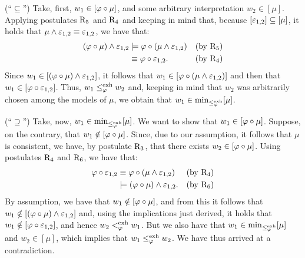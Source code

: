 \begin{prf*}{}{}
	(``$\subseteq$'') 
	Take, first, $w_1\in[\varphi\circ\mu]$,
	and some arbitrary interpretation $w_2\in[\mu]$.
	Applying postulates $\mathrm{R}_{5}$ and $\mathrm{R}_{4}$
	and keeping in mind that, because $[\varepsilon_{1,2}]\subseteq[\mu]$,
	it holds that $\mu\land\varepsilon_{1,2}\equiv\varepsilon_{1,2}$,
	we have that:
	\begin{align*}
		(\varphi\circ\mu)\land\varepsilon_{1,2} &\models\varphi\circ(\mu\land\varepsilon_{1,2})    &(\text{by}~\mathrm{R}_{5})\\
		 										     &\equiv\varphi\circ\varepsilon_{1,2}. &(\text{by}~\mathrm{R}_{4})
	\end{align*}
	Since $w_1\in[(\varphi\circ\mu)\land\varepsilon_{1,2}]$, it follows that
	$w_1\in[\varphi\circ(\mu\land\varepsilon_{1,2})]$
	and then that $w_1\in[\varphi\circ\varepsilon_{1,2}]$.
	Thus, $w_1\le^{{\operatorname{exh}}}_\varphi w_2$ and, 
	keeping in mind that $w_2$ was arbitrarily chosen among the models of $\mu$,
	we obtain that $w_1\in{\operatorname{min}}_{\le^{\operatorname{exh}}_\varphi}[\mu]$.
	
	(``$\supseteq$'') 
	Take, now, $w_1\in{\operatorname{min}}_{\le^{\operatorname{exh}}_\varphi}[\mu]$.
	We want to show that $w_1\in[\varphi\circ\mu]$.
	Suppose, on the contrary, that $w_1\notin[\varphi\circ\mu]$.
	Since, due to our assumption, it follows that $\mu$ is consistent,
	we have, by postulate $\mathrm{R}_{3}$, that there exists $w_2\in[\varphi\circ\mu]$.
	Using postulates $\mathrm{R}_{4}$ and $\mathrm{R}_{6}$, we have that: 
	\begin{align*}
		\varphi\circ\varepsilon_{1,2} &\equiv\varphi\circ(\mu\land\varepsilon_{1,2})    &(\text{by}~\mathrm{R}_{4})\\
		 					  &\models(\varphi\circ\mu)\land\varepsilon_{1,2}. &(\text{by}~\mathrm{R}_{6})
	\end{align*}
	By assumption, we have that $w_1\notin[\varphi\circ\mu]$, and from this it follows that 
	$w_1\notin[(\varphi\circ\mu)\land\varepsilon_{1,2}]$ and, using the implications just derived,
	it holds that
	$w_1\notin[\varphi\circ\varepsilon_{1,2}]$,
	and hence $w_2<^{\operatorname{exh}}_\varphi w_1$.
	But we also have that $w_1\in{\operatorname{min}}_{\le^{\operatorname{exh}}_\varphi}[\mu]$ and $w_2\in[\mu]$,
	which implies that $w_1\le^{\operatorname{exh}}_\varphi w_2$.
	We have thus arrived at a contradiction.
\end{prf*}

